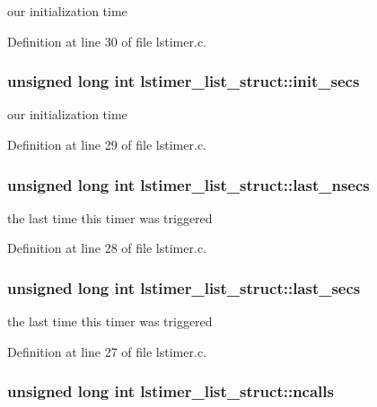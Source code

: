 our initialization time 

Definition at line 30 of file lstimer.c.\hypertarget{structlstimer__list__struct_a1222c76d49b149725467aa698abb7fb1}{
\subsubsection[{init\_\-secs}]{\setlength{\rightskip}{0pt plus 5cm}unsigned long int {\bf lstimer\_\-list\_\-struct::init\_\-secs}}}
\label{structlstimer__list__struct_a1222c76d49b149725467aa698abb7fb1}


our initialization time 

Definition at line 29 of file lstimer.c.\hypertarget{structlstimer__list__struct_a19acf5aa7f57aa7ce60537c3d3d6a6af}{
\subsubsection[{last\_\-nsecs}]{\setlength{\rightskip}{0pt plus 5cm}unsigned long int {\bf lstimer\_\-list\_\-struct::last\_\-nsecs}}}
\label{structlstimer__list__struct_a19acf5aa7f57aa7ce60537c3d3d6a6af}


the last time this timer was triggered 

Definition at line 28 of file lstimer.c.\hypertarget{structlstimer__list__struct_ab0ac2907735701cb24ec9af95a1cc787}{
\subsubsection[{last\_\-secs}]{\setlength{\rightskip}{0pt plus 5cm}unsigned long int {\bf lstimer\_\-list\_\-struct::last\_\-secs}}}
\label{structlstimer__list__struct_ab0ac2907735701cb24ec9af95a1cc787}


the last time this timer was triggered 

Definition at line 27 of file lstimer.c.\hypertarget{structlstimer__list__struct_aa56c5b8ce7fa0ae93132cb9908195836}{
\subsubsection[{ncalls}]{\setlength{\rightskip}{0pt plus 5cm}unsigned long int {\bf lstimer\_\-list\_\-struct::ncalls}}}
\label{structlstimer__list__struct_aa56c5b8ce7fa0ae93132cb9908195836}


